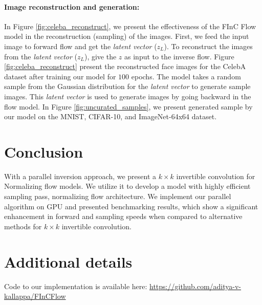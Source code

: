 \documentclass[a4paper,twoside]{article}
\theoremstyle{definition}
\begin{document}
\paragraph{Image reconstruction and generation:}
In Figure \ref{fig:celeba_reconstruct}, we present the effectiveness of the  FInC Flow model in the reconstruction (sampling) of the images. First, we feed the input image to forward flow and get the \emph{latent vector} ($z_L$). To reconstruct the images from the \emph{latent vector} ($z_L$), give the $z$ as input to the inverse flow. Figure \ref{fig:celeba_reconstruct} present the reconstructed face images for the CelebA dataset after training our model for $100$ epochs. The model takes a random sample from the Gaussian distribution for the \emph{latent vector} to generate sample images. This \emph{latent vector} is used to generate images by going backward in the flow model. In Figure \ref{fig:uncurated_samples}, we present generated sample by our model on the MNIST, CIFAR-10, and ImageNet-64x64 dataset.





























 \section{Conclusion}

With a parallel inversion approach, we present a $k \times k$ invertible convolution for Normalizing flow models. We utilize it to develop a model with highly efficient sampling pass, normalizing flow architecture. We implement our parallel algorithm on GPU and presented benchmarking results, which show a significant enhancement in forward and sampling speeds when compared to alternative methods for $k \times k$ invertible convolution.




%
 






\section*{Additional details}
Code to our implementation is available here:   \url{https://github.com/aditya-v-kallappa/FInCFlow}
\noindent
\end{document}
